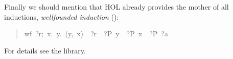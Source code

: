 \begin{isabelle}
\begin{isamarkuptext}
Finally we should mention that HOL already provides the mother of all
inductions, \emph{wellfounded induction} ():
\begin{quote}

\begin{isabelle}%
{\isasymlbrakk}wf\ \mbox{?r};\ {\isasymAnd}\mbox{x}.\ {\isasymforall}\mbox{y}.\ (\mbox{y},\ \mbox{x})\ {\isasymin}\ \mbox{?r}\ {\isasymlongrightarrow}\ \mbox{?P}\ \mbox{y}\ {\isasymLongrightarrow}\ \mbox{?P}\ \mbox{x}{\isasymrbrakk}\ {\isasymLongrightarrow}\ \mbox{?P}\ \mbox{?a}
\end{isabelle}%

\end{quote}
For details see the library.%
\end{isamarkuptext}%
\end{isabelle}%
